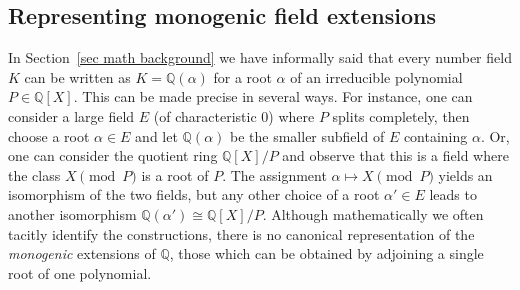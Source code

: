 \documentclass[a4paper,USenglish,cleveref, autoref, thm-restate]{lipics-v2021}
\newcommand{\lean}[1]{\texttt{#1}\xspace} %
\newcommand{\mathlib}{\textsf{mathlib}\xspace}
\newcommand{\Q}{\mathbb{Q}}
\newcommand{\Z}{\mathbb{Z}}
\begin{document}
%
%
%
%
%
%
%

\subsection{Representing monogenic field extensions} \label{sec:monogenic-field-extension}

In Section~\ref{sec math background} we have informally said that every number field $K$ can be written as $K=\Q(\alpha)$ for a root $\alpha$ of an irreducible polynomial $P\in\Q[X]$. This can be made precise in several ways. For instance, one can consider a large field $E$ (of characteristic $0$) where $P$ splits completely, then choose a root $\alpha\in E$ and let $\Q(\alpha)$ be the smaller subfield of $E$ containing $\alpha$. Or, one can consider the quotient ring $\Q[X]/P$ and observe that this is a field where the class $X\pmod{P}$ is a root of $P$. The assignment $\alpha\mapsto X\pmod{P}$ yields an isomorphism of the two fields, but any other choice of a root $\alpha'\in E$ leads to another isomorphism $\Q(\alpha')\cong \Q[X]/P$. Although mathematically we often tacitly identify the constructions, there is no canonical representation of the \emph{monogenic} extensions of $\Q$, those which can be obtained by adjoining a single root of one polynomial.
\end{document}
